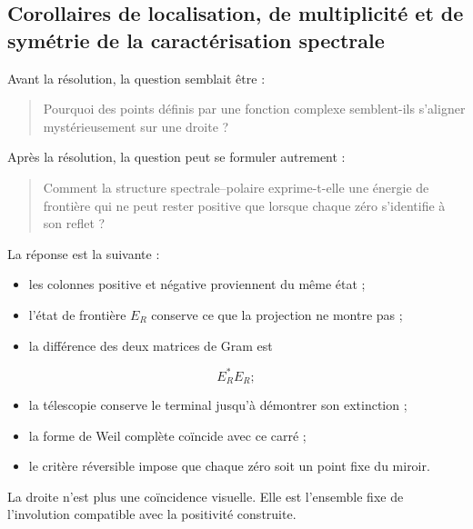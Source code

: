 \subsection{Corollaires de localisation, de multiplicité et de symétrie de la caractérisation spectrale}
Avant la résolution, la question semblait être :\par
\begin{quote}
Pourquoi des points définis par une fonction complexe semblent-ils s'aligner mystérieusement sur une droite ?\par
\end{quote}
Après la résolution, la question peut se formuler autrement :\par
\begin{quote}
Comment la structure spectrale–polaire exprime-t-elle une énergie de frontière qui ne peut rester positive que lorsque chaque zéro s'identifie à son reflet ?\par
\end{quote}
La réponse est la suivante :\par
\begin{itemize}
\item les colonnes positive et négative proviennent du même état ;
\item l'état de frontière \(E_R\) conserve ce que la projection ne montre pas ;
\item la différence des deux matrices de Gram est
\end{itemize}
\[
E_R^*E_R;
\]
\begin{itemize}
\item la télescopie conserve le terminal jusqu'à démontrer son extinction ;
\item la forme de Weil complète coïncide avec ce carré ;
\item le critère réversible impose que chaque zéro soit un point fixe du miroir.
\end{itemize}
La droite n'est plus une coïncidence visuelle. Elle est l'ensemble fixe de l'involution compatible avec la positivité construite.\par
{}
